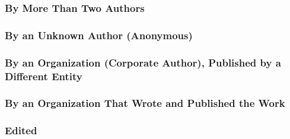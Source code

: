 \documentclass{ltxdockit}
\begin{document}
\subsubsection{By More Than Two Authors} %
\label{ssub:by_more_than_two_authors}
\begin{refsection}
	\printbibliography[heading=none]
\end{refsection}
\subsubsection{By an Unknown Author (Anonymous)} %
\label{ssub:by_an_unknown_author_anonymous}
\begin{refsection}
	\printbibliography[heading=none]
\end{refsection}
\subsubsection{By an Organization (Corporate Author), Published by a Different Entity} %
\label{ssub:by_an_organization_corporate_author_published_by_a_different_entity}
\begin{refsection}
	\printbibliography[heading=none]
\end{refsection}
\subsubsection{By an Organization That Wrote and Published the Work} %
\label{ssub:by_an_organization_that_wrote_and_published_the_work}
\begin{refsection}
	\printbibliography[heading=none]
\end{refsection}
\subsubsection{Edited} %
\label{ssub:edited}
\begin{refsection}
	\printbibliography[heading=none]
\end{refsection}
\end{document}
